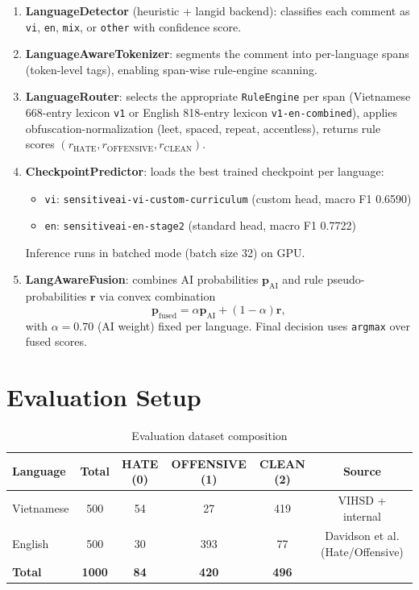 \documentclass[11pt,a4paper]{article}
\begin{document}
\begin{enumerate}
    \item \textbf{LanguageDetector} (heuristic + langid backend): classifies each comment as \texttt{vi}, \texttt{en}, \texttt{mix}, or \texttt{other} with confidence score.
    \item \textbf{LanguageAwareTokenizer}: segments the comment into per-language spans (token-level tags), enabling span-wise rule-engine scanning.
    \item \textbf{LanguageRouter}: selects the appropriate \texttt{RuleEngine} per span (Vietnamese 668-entry lexicon \texttt{v1} or English 818-entry lexicon \texttt{v1-en-combined}), applies obfuscation-normalization (leet, spaced, repeat, accentless), returns rule scores $(r_{\text{HATE}}, r_{\text{OFFENSIVE}}, r_{\text{CLEAN}})$.
    \item \textbf{CheckpointPredictor}: loads the best trained checkpoint per language:
    \begin{itemize}
        \item \texttt{vi}: \texttt{sensitiveai-vi-custom-curriculum} (custom head, macro F1 0.6590)
        \item \texttt{en}: \texttt{sensitiveai-en-stage2} (standard head, macro F1 0.7722)
    \end{itemize}
    Inference runs in batched mode (batch size 32) on GPU.
    \item \textbf{LangAwareFusion}: combines AI probabilities $\mathbf{p}_{\text{AI}}$ and rule pseudo-probabilities $\mathbf{r}$ via convex combination
    \begin{equation}
        \mathbf{p}_{\text{fused}} = \alpha \mathbf{p}_{\text{AI}} + (1-\alpha) \mathbf{r},
    \end{equation}
    with $\alpha = 0.70$ (AI weight) fixed per language. Final decision uses \texttt{argmax} over fused scores.
\end{enumerate}

\section{Evaluation Setup}
\label{sec:setup}

\begin{table}[H]
\centering
\caption{Evaluation dataset composition}
\label{tab:dataset}
\begin{tabular}{lccccc}
\toprule
Language & Total & HATE (0) & OFFENSIVE (1) & CLEAN (2) & Source \\
\midrule
Vietnamese & 500 & 54 & 27 & 419 & VIHSD + internal \\
English     & 500 & 30 & 393 & 77 & Davidson et al. (Hate/Offensive) \\
\midrule
\textbf{Total} & \textbf{1000} & \textbf{84} & \textbf{420} & \textbf{496} & \\
\bottomrule
\end{tabular}
\end{table}
\end{document}
